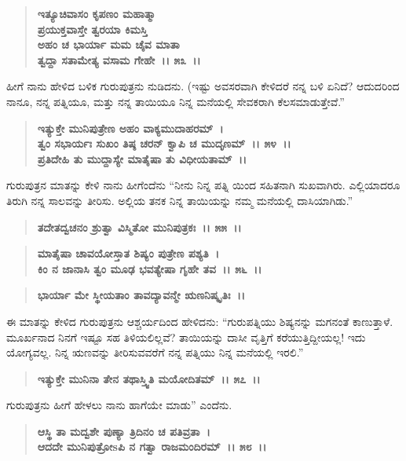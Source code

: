 \begin{verse}
\textbf{ಇತ್ಯೂಚಿವಾಸಂ ಕೃಪಣಂ ಮಹಾತ್ಮಾ} \\\textbf{ಪ್ರಯುಕ್ತವಾಸ್ತೇ ತ್ವರಯಾ ಕಿಮಸ್ತಿ}\\\textbf{ಅಹಂ ಚ ಭಾರ್ಯಾ ಮಮ ಚೈವ ಮಾತಾ} \\\textbf{ತ್ವದ್ದಾ ಸತಾಮೇತ್ಯ ವಸಾಮ ಗೇಹೇ~।। ೫೩~।।}
\end{verse}

ಹೀಗೆ ನಾನು ಹೇಳಿದ ಬಳಿಕ ಗುರುಪುತ್ರನು ನುಡಿದನು. (ಇಷ್ಟು ಅವಸರವಾಗಿ ಕೇಳಿದರೆ ನನ್ನ ಬಳಿ ಏನಿದೆ? ಆದುದರಿಂದ ನಾನೂ, ನನ್ನ ಪತ್ನಿಯೂ, ಮತ್ತು ನನ್ನ ತಾಯಿಯೂ ನಿನ್ನ ಮನೆಯಲ್ಲಿ ಸೇವಕರಾಗಿ ಕೆಲಸಮಾಡುತ್ತೇವೆ.”

\begin{verse}
\textbf{ಇತ್ಯುಕ್ತೇ ಮುನಿಪುತ್ರೇಣ ಅಹಂ ವಾಕ್ಯಮುದಾಹರಮ್~।}\\\textbf{ತ್ವಂ ಸಭಾರ್ಯಃ ಸುಖಂ ತಿಷ್ಠ ಚರನ್ ಕ್ವಾಪಿ ಚ ಮುದೃಣಮ್~।। ೫೪~।। }\\\textbf{ಪ್ರತಿದೇಹಿ ತು ಮುದ್ದಾಸ್ಯೇ ಮಾತೈಷಾ ತು ವಿಧೀಯತಾಮ್~।।}
\end{verse}

ಗುರುಪುತ್ರನ ಮಾತನ್ನು ಕೇಳಿ ನಾನು ಹೀಗೆಂದೆನು “ನೀನು ನಿನ್ನ ಪತ್ನಿ ಯಿಂದ ಸಹಿತನಾಗಿ ಸುಖವಾಗಿರು. ಎಲ್ಲಿಯಾದರೂ ತಿರುಗಿ ನನ್ನ ಸಾಲವನ್ನು ತೀರಿಸು. ಅಲ್ಲಿಯ ತನಕ ನಿನ್ನ ತಾಯಿಯನ್ನು ನಮ್ಮ ಮನೆಯಲ್ಲಿ ದಾಸಿಯಾಗಿಡು.”

\begin{verse}
\textbf{ತದೇತದ್ವಚನಂ ಶ್ರುತ್ವಾ ವಿಸ್ಮಿತೋ ಮುನಿಪುತ್ರಕಃ~।। ೫೫~।।} 
\end{verse}

\begin{verse}
\textbf{ಮಾತೈಷಾ ಚಾವಯೋಸ್ತಾತ ಶಿಷ್ಯಂ ಪುತ್ರೇಣ ಪಶ್ಯತಿ~।}\\\textbf{ಕಿಂ ನ ಜಾನಾಸಿ ತ್ವಂ ಮೂಢ ಭವತ್ಯೇಷಾ ಗೃಹೇ ತವ~।। ೫೬~।। }
\end{verse}

\begin{verse}
\textbf{ಭಾರ್ಯಾ ಮೇ ಸ್ಥೀಯತಾಂ ತಾವದ್ಯಾವನ್ಮೇ ಋಣನಿಷ್ಕೃತಿಃ~।।}
\end{verse}

ಈ ಮಾತನ್ನು ಕೇಳಿದ ಗುರುಪುತ್ರನು ಆಶ್ಚರ್ಯದಿಂದ ಹೇಳಿದನು: “ಗುರುಪತ್ನಿಯು ಶಿಷ್ಯನನ್ನು ಮಗನಂತೆ ಕಾಣುತ್ತಾಳೆ. ಮೂರ್ಖನಾದ ನಿನಗೆ ಇಷ್ಟೂ ಸಹ ತಿಳಿಯಲಿಲ್ಲವೆ? ತಾಯಿಯನ್ನು ದಾಸೀ ವೃತ್ತಿಗೆ ಕರೆಯುತ್ತಿದ್ದೀಯಲ್ಲ! ಇದು ಯೋಗ್ಯವಲ್ಲ. ನಿನ್ನ ಋಣವನ್ನು ತೀರಿಸುವವರೆಗೆ ನನ್ನ ಪತ್ನಿಯು ನಿನ್ನ ಮನೆಯಲ್ಲಿ ಇರಲಿ.”

\begin{verse}
\textbf{ಇತ್ಯುಕ್ತೇ ಮುನಿನಾ ತೇನ ತಥಾಸ್ತ್ವಿತಿ ಮಯೋದಿತಮ್~।। ೫೭~।।} 
\end{verse}

ಗುರುಪುತ್ರನು ಹೀಗೆ ಹೇಳಲು ನಾನು ಹಾಗೆಯೇ ಮಾಡು” ಎಂದೆನು.

\begin{verse}
\textbf{ಆಸ್ಥಿ ತಾ ಮದ್ವಶೇ ಪುಣ್ಯಾ ತ್ರಿದಿನಂ ಚ ಪತಿವ್ರತಾ~।}\\\textbf{ಆದದೇ ಮುನಿಪುತ್ರೋsಪಿ ನ ಗತ್ವಾ ರಾಜಮಂದಿರಮ್~।। ೫೮~।। }
\end{verse}

